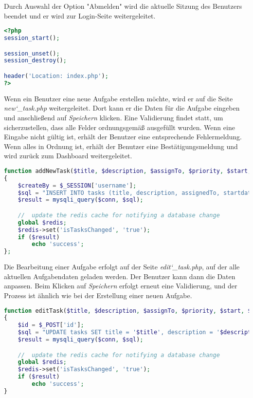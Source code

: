 Durch Auswahl der Option "Abmelden" wird die aktuelle Sitzung des Benutzers beendet und er wird zur Login-Seite weitergeleitet.

\begin{lstlisting}[language=PHP, caption=Php script für die Abmeldung]
<?php
session_start();

session_unset();
session_destroy();

header('Location: index.php');
?>
\end{lstlisting}

Wenn ein Benutzer eine neue Aufgabe erstellen möchte, wird er auf die Seite \emph{new\char`_task.php} weitergeleitet. Dort kann er die Daten für die Aufgabe eingeben und anschließend auf \emph{Speichern} klicken. Eine Validierung findet statt, um sicherzustellen, dass alle Felder ordnungsgemäß ausgefüllt wurden. Wenn eine Eingabe nicht gültig ist, erhält der Benutzer eine entsprechende Fehlermeldung. Wenn alles in Ordnung ist, erhält der Benutzer eine Bestätigungsmeldung und wird zurück zum Dashboard weitergeleitet.

\begin{lstlisting}[language=PHP, caption=Methode für die Erstellung einer neuen Aufgabe]
function addNewTask($title, $description, $assignTo, $priority, $start, $end, $conn)
{
    $createBy = $_SESSION['username'];
    $sql = "INSERT INTO tasks (title, description, assignedTo, startdate, enddate, priority, createBy, status) VALUES ('$title', '$description', '$assignTo', '$start', '$end', '$priority', '$createBy', 'begin')";
    $result = mysqli_query($conn, $sql);

    //  update the redis cache for notifying a database change
    global $redis;
    $redis->set('isTasksChanged', 'true');
    if ($result)
        echo 'success';
};
\end{lstlisting}

Die Bearbeitung einer Aufgabe erfolgt auf der Seite \emph{edit\char`_task.php}, auf der alle aktuellen Aufgabendaten geladen werden. Der Benutzer kann dann die Daten anpassen. Beim Klicken auf \emph{Speichern} erfolgt erneut eine Validierung, und der Prozess ist ähnlich wie bei der Erstellung einer neuen Aufgabe.

\begin{lstlisting}[language=PHP, caption=Methode für das Update einer neuen Aufgabe]
function editTask($title, $description, $assignTo, $priority, $start, $end, $conn)
{
    $id = $_POST['id'];
    $sql = "UPDATE tasks SET title = '$title', description = '$description', assignedTo = '$assignTo', startdate = '$start', enddate = '$end', priority = '$priority' WHERE id = '$id'";
    $result = mysqli_query($conn, $sql);

    //  update the redis cache for notifying a database change
    global $redis;
    $redis->set('isTasksChanged', 'true');
    if ($result)
        echo 'success';
}
\end{lstlisting}

